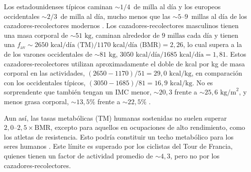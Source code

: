 \documentclass[12pt]{book}
\begin{document}
Los estadounidenses típicos caminan $\sim 1/4$~de milla al día y los europeos occidentales $\sim 2/3$~de milla al día, mucho menos que las $\sim 5\text{--}9$~millas al día de los cazadores-recolectores modernos \cite{7}. Los cazadores-recolectores masculinos tienen una masa corporal de $\sim 51\text{ kg}$, caminan alrededor de $9\text{ millas}$ cada día y tienen una $f_{\text{av}} \sim 2650\text{ kcal/día} \text{ (TM)} / 1170\text{ kcal/día} \text{ (BMR)} = 2,26$, lo cual supera a la de los varones occidentales de $\sim 81\text{ kg}$, $3050\text{ kcal/día} / 1685\text{ kcal/día} = 1,81$. Estos cazadores-recolectores utilizan aproximadamente el doble de kcal por kg de masa corporal en las actividades, $(2650 - 1170)/51 = 29{,}0\text{ kcal/kg}$, en comparación con los occidentales típicos, $(3050 - 1685)/81 = 16{,}9\text{ kcal/kg}$. No es sorprendente que también tengan un IMC menor, $\sim 20{,}3$ frente a $\sim 25{,}6\text{ kg/m}^2$, y menos grasa corporal, $\sim 13{,}5\%$ frente a $\sim 22{,}5\%$ \cite{56,62,82}.

Aun así, las tasas metabólicas (TM) humanas sostenidas no suelen superar $2{,}0\text{--}2{,}5 \times \text{BMR}$, excepto para aquellos en ocupaciones de alto rendimiento, como los atletas de resistencia. Esto podría constituir un techo metabólico para los seres humanos \cite{29,46,78}. Este límite es superado por los ciclistas del Tour de Francia, quienes tienen un factor de actividad promedio de $\sim 4{,}3$, pero no por los cazadores-recolectores.
\end{document}
